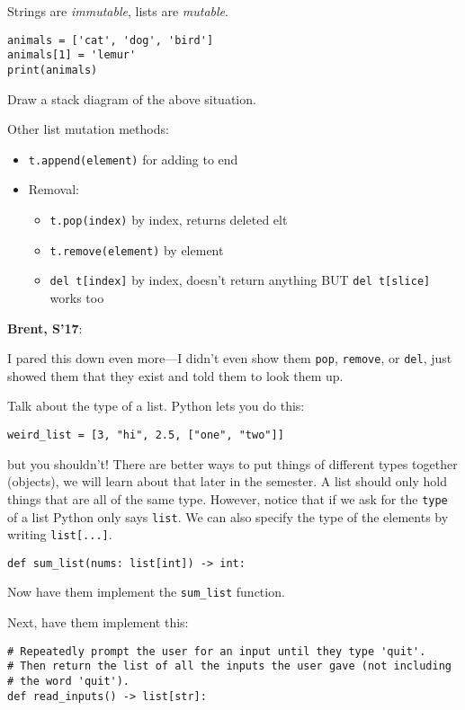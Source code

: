 \documentclass{article}
\newenvironment{reflect}[1]
{
  \noindent
  \begin{lrbox}{\reflectbox}
    \begin{minipage}[t]{\textwidth}
      \textbf{#1}:
}{
    \end{minipage}
  \end{lrbox}
  \fbox{\usebox{\reflectbox}}
}
\begin{document}
Strings are \emph{immutable}, lists are \emph{mutable}.

\begin{verbatim}
animals = ['cat', 'dog', 'bird']
animals[1] = 'lemur'
print(animals)
\end{verbatim}
Draw a stack diagram of the above situation.

Other list mutation methods:
\begin{itemize}
\item \verb|t.append(element)| for adding to end
\item Removal:
  \begin{itemize}
  \item \verb|t.pop(index)| by index, returns deleted elt
  \item \verb|t.remove(element)| by element
  \item \verb|del t[index]| by index, doesn't return anything BUT
	\verb|del t[slice]| works too
  \end{itemize}
\end{itemize}

\begin{reflect}{Brent, S'17}
  I pared this down even more---I didn't even show them \verb|pop|,
  \verb|remove|, or \verb|del|, just showed them that they exist and
  told them to look them up.
\end{reflect}

Talk about the type of a list. Python lets you do this:
\begin{verbatim}
weird_list = [3, "hi", 2.5, ["one", "two"]]
\end{verbatim}
but you shouldn't!  There are better ways to put things of different
types together (objects), we will learn about that later in the
semester.  A list should only hold things that are all of the same
type. However, notice that if we ask for the \verb|type| of a list
Python only says \verb|list|.  We can also specify the type of the
elements by writing \verb|list[...]|.

\begin{verbatim}
def sum_list(nums: list[int]) -> int:
\end{verbatim}

Now have them implement the \verb|sum_list| function.

Next, have them implement this:
\begin{verbatim}
# Repeatedly prompt the user for an input until they type 'quit'.
# Then return the list of all the inputs the user gave (not including
# the word 'quit').
def read_inputs() -> list[str]:
\end{verbatim}
\end{document}
